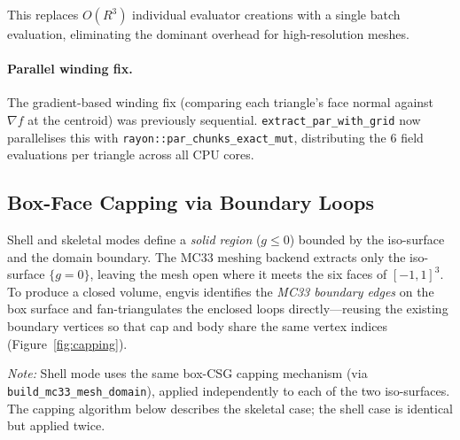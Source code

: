 \documentclass[11pt]{article}
\begin{document}
This replaces $O(R^3)$ individual evaluator creations with a single
batch evaluation, eliminating the dominant overhead for
high-resolution meshes.

\paragraph{Parallel winding fix.}
The gradient-based winding fix (comparing each triangle's face normal
against $\nabla f$ at the centroid) was previously sequential.
\texttt{extract\_par\_with\_grid} now parallelises this with
\texttt{rayon::par\_chunks\_exact\_mut}, distributing the 6 field
evaluations per triangle across all CPU cores.

\subsection{Box-Face Capping via Boundary Loops}\label{sec:capping}

Shell and skeletal modes define a \emph{solid region}
($g \le 0$) bounded by the iso-surface and the domain boundary.
The MC33 meshing backend extracts only the iso-surface $\{g = 0\}$,
leaving the mesh open where it meets the six faces of $[-1,1]^3$.
To produce a closed volume, engvis identifies the \emph{MC33 boundary
edges} on the box surface and fan-triangulates the enclosed loops
directly---reusing the existing boundary vertices so that cap and body
share the same vertex indices (Figure~\ref{fig:capping}).

\emph{Note:} Shell mode uses the same box-CSG capping mechanism
(via \texttt{build\_mc33\_mesh\_domain}), applied independently to
each of the two iso-surfaces.  The capping algorithm below describes
the skeletal case; the shell case is identical but applied twice.
\end{document}
